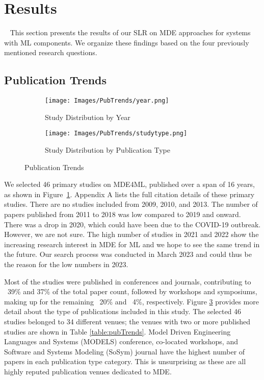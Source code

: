 \section{Results}~\label{sec:Results}
This section presents the results of our SLR on MDE approaches for systems with ML components. We organize these findings based on the four previously mentioned research questions.
\subsection{Publication Trends}

\begin{figure}[htbp]
    \centering
    \begin{subfigure}{0.5\textwidth}
    \texttt{[image: Images/PubTrends/year.png]}
    \caption{Study Distribution by Year}
    \label{fig:yearDist}
    \vspace*{-1em}
    \end{subfigure}
\hfill
    \begin{subfigure}{0.45\textwidth}
    \centering
    \texttt{[image: Images/PubTrends/studytype.png]}
    \caption{Study Distribution by Publication Type}
    \label{fig:studyType}
    \vspace*{-1em}
\end{subfigure}
    \vspace*{1em}
 \caption{Publication Trends}
\end{figure}

We selected 46 primary studies on MDE4ML, published over a span of 16 years, as shown in Figure~\ref{fig:yearDist}. Appendix A lists the full citation details of these primary studies. There are no studies included from 2009, 2010, and 2013. The number of papers published from 2011 to 2018 was low compared to 2019 and onward. There was a drop in 2020, which could have been due to the COVID-19 outbreak. However, we are not sure. The high number of studies in 2021 and 2022 show the increasing research interest in MDE for ML and we hope to see the same trend in the future. Our search process was conducted in March 2023 and could thus be the reason for the low numbers in 2023.  

Most of the studies were published in conferences and journals, contributing to ~39\% and 37\% of the total paper count, followed by workshops and symposiums, making up for the remaining ~20\% and ~4\%, respectively. Figure \ref{fig:studyType} provides more detail about the type of publications included in this study. The selected 46 studies belonged to 34 different venues; the venues with two or more published studies are shown in Table \ref{table:pubTrends}. Model Driven Engineering Languages and Systems (MODELS) conference, co-located workshops, and Software and Systems Modeling (SoSym) journal have the highest number of papers in each publication type category. This is unsurprising as these are all highly reputed publication venues dedicated to MDE. 


